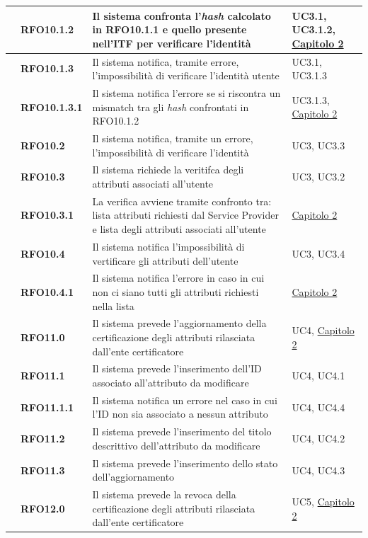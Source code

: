 \begin{longtable}{|r l|p{10cm}|p{2cm}|}
	&\textbf{RFO10.1.2}&Il sistema confronta l'\textit{hash} calcolato in RFO10.1.1 e quello presente nell'\gls{ITF} per verificare l'identità& UC3.1, UC3.1.2, \hyperref[cap:tecnologie_e_strumenti]{Capitolo 2} \\\hline
	&\textbf{RFO10.1.3}&Il sistema notifica, tramite errore, l'impossibilità di verificare l'identità utente&UC3.1, UC3.1.3 \\\hline
	&\textbf{RFO10.1.3.1}&Il sistema notifica l'errore se si riscontra un mismatch tra gli \textit{hash} confrontati in RFO10.1.2&UC3.1.3, \hyperref[cap:tecnologie_e_strumenti]{Capitolo 2} \\\hline
	&\textbf{RFO10.2}&Il sistema notifica, tramite un errore, l'impossibilità di verificare l'identità& UC3, UC3.3 \\\hline
	&\textbf{RFO10.3}&Il sistema richiede la veritifca degli attributi associati all'utente&UC3, UC3.2 \\\hline
	&\textbf{RFO10.3.1}&La verifica avviene tramite confronto tra: lista attributi richiesti dal Service Provider e lista degli attributi associati all'utente&\hyperref[cap:tecnologie_e_strumenti]{Capitolo 2} \\\hline
	&\textbf{RFO10.4}&Il sistema notifica l'impossibilità di vertificare gli attributi dell'utente&UC3, UC3.4 \\\hline
	&\textbf{RFO10.4.1}&Il sistema notifica l'errore in caso in cui non ci siano tutti gli attributi richiesti nella lista&\hyperref[cap:tecnologie_e_strumenti]{Capitolo 2} \\\hline
	&\textbf{RFO11.0}&Il sistema prevede l'aggiornamento della certificazione degli attributi rilasciata dall'ente certificatore &UC4, \hyperref[cap:tecnologie_e_strumenti]{Capitolo 2} \\\hline
	&\textbf{RFO11.1}&Il sistema prevede l'inserimento dell'ID associato all'attributo da modificare&UC4, UC4.1 \\\hline
	&\textbf{RFO11.1.1}&Il sistema notifica un errore nel caso in cui l'ID non sia associato a nessun attributo&UC4, UC4.4 \\\hline
	&\textbf{RFO11.2}&Il sistema prevede l'inserimento del titolo descrittivo dell'attributo da modificare& UC4, UC4.2 \\\hline
	&\textbf{RFO11.3}&Il sistema prevede l'inserimento dello stato dell'aggiornamento&UC4, UC4.3 \\\hline
	&\textbf{RFO12.0}&Il sistema prevede la revoca della certificazione degli attributi rilasciata dall'ente certificatore&UC5, \hyperref[cap:tecnologie_e_strumenti]{Capitolo 2} \\\hline

\end{longtable}

